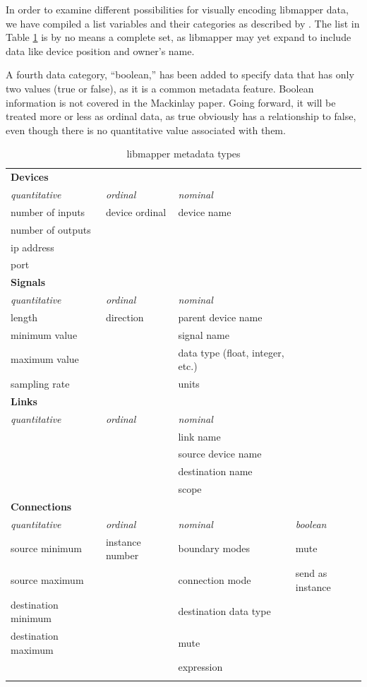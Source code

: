 In order to examine different possibilities for visually encoding libmapper data, we have compiled a list variables and their categories as described by . The list in Table \ref{tab:metadata_types} is by no means a complete set, as libmapper may yet expand to include data like device position and owner's name.

A fourth data category, ``boolean,'' has been added to specify data that has only two values (true or false), as it is a common metadata feature. Boolean information is not covered in the Mackinlay paper. Going forward, it will be treated more or less as ordinal data, as true obviously has a relationship to false, even though there is no quantitative value associated with them.

\newpage

\begin{longtable}{l l p{4cm} l}
\caption[libmapper metadata types]{libmapper metadata types} \label{tab:metadata_types} \\

	\hline\hline
	\textbf{Devices} & & \\
	\emph{quantitative} & \emph{ordinal} & \emph{nominal}\\
	\hline
	number of inputs & device ordinal & device name\\
		number of outputs \\
	ip address \\
	port \\ [0.7cm]

	\hline\hline
	\textbf{Signals} & & \\
	\emph{quantitative} & \emph{ordinal} & \emph{nominal}\\
	\hline
	length & direction & parent device name\\
	minimum value & & signal name \\
	maximum value & & data type (float, integer, etc.)\\
	sampling rate & & units \\ [0.7cm]

	\hline\hline
	\textbf{Links} & & \\
	\emph{quantitative} & \emph{ordinal} & \emph{nominal}\\
	\hline
	& & link name \\
	& & source device name \\
	& & destination name \\
	& & scope \\ [0.7cm]

	\hline\hline
	\textbf{Connections} & & \\
	\emph{quantitative} & \emph{ordinal} & \emph{nominal} & \emph{boolean}\\
	\hline
	source minimum & instance number & boundary modes & mute\\
	source maximum & & connection mode & send as instance\\
	destination minimum & & destination data type \\
	destination maximum & & mute \\
	& & expression \\
	& & \\
\end{longtable}

